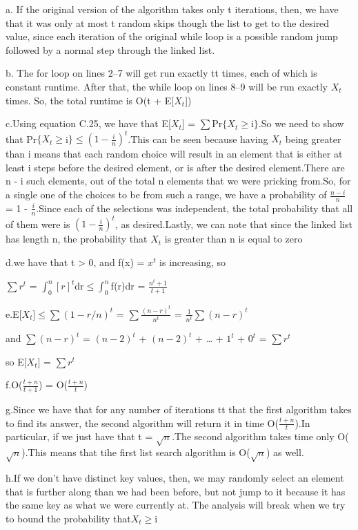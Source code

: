 \documentclass[a4paper, justified]{tufte-handout}
\begin{document}
\begin{solution}
  a. If the original version of the algorithm takes only t iterations, then, we have that it was only at most t random skips though the list to get to the desired value, since each iteration of the original while loop is a possible random jump followed by a normal step through the linked list.

  b. The for loop on lines 2–7 will get run exactly tt times, each of which is constant runtime. After that, the while loop on lines 8–9 will be run exactly $X_t$ times. So, the total runtime is O(t + E[$X_t$])

  c.Using equation C.25, we have that E[$X_t$] = $\sum$Pr$\{$$X_t$$\ge$i$\}$.So we need to show that Pr$\{$$X_t$$\ge$i$\}$$\le$$(1 - \frac{i}{n})^t$.This can be seen because having $X_t$ being greater than i means that each random choice will result in an element that is either at least i steps before the desired element, or is after the desired element.There are n - i such elements, out of the total n elements that we were pricking from.So, for a single one of the choices to be from such a range, we have a probability of $\frac{n - i}{n}$ = 1 - $\frac{i}{n}$.Since each of the selections was independent, the total probability that all of them were is $(1 - \frac{i}{n})^t$, as desired.Lastly, we can note that since the linked list has length n, the probability that $X_t$ is greater than n is equal to zero

  d.we have that t > 0, and f(x) = $x^t$ is increasing, so

  $\sum$$r^t$ = $\int_0^n$$[r]^t$dr$\le$$\int_0^n$f(r)dr = $\frac{n^t + 1}{t + 1}$

        e.E[$X_t$]$\le$$\sum$$(1 - r/n)^t$ = $\sum$$\frac{(n - r)^t}{n^t}$ = $\frac{1}{n^t}$$\sum$$(n - r)^t$

      and $\sum$$(n - r)^t$ = $(n - 2)^t$ + $(n - 2)^t$ + … + $1^t$ + $0^t$ = $\sum$$r^t$

      so E[$X_t$] = $\sum$$r^t$

        f.O($\frac{t + n}{t + 1}$) = O($\frac{t + n}{t}$)

        g.Since we have that for any number of iterations tt that the first algorithm takes to find its answer, the second algorithm will return it in time O($\frac{t + n}{t}$).In particular, if we just have that t = $\sqrt{n}$.The second algorithm takes time only O($\sqrt{n}$).This means that tihe first list search algorithm is
        O($\sqrt{n}$) as well.

        h.If we don't have distinct key values, then, we may randomly select an element that is further along than we had been before, but not jump to it because it has the same key as what we were currently at. The analysis will break when we try to bound the probability that$X_t$$\ge$i
\end{solution}
\end{document}
